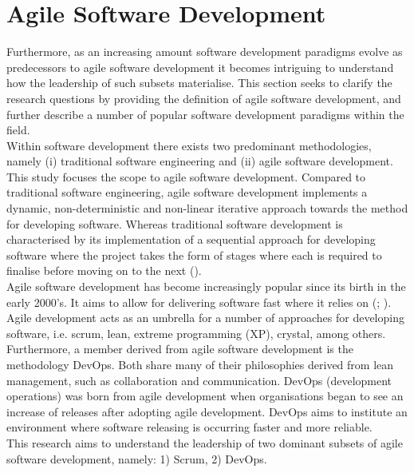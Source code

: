 \section{Agile Software Development}

Furthermore, as an increasing amount software development paradigms evolve as predecessors to agile software development it becomes intriguing to understand how the leadership of such subsets materialise. This section seeks to clarify the research questions by providing the definition of agile software development, and further describe a number of popular software development paradigms within the field.\\

Within software development there exists two predominant methodologies, namely (i) traditional software engineering and (ii) agile software development. This study focuses the scope to agile software development. Compared to traditional software engineering, agile software development implements a dynamic, non-deterministic and non-linear iterative approach towards the method for developing software. Whereas traditional software development is characterised by its implementation of a sequential approach for developing software where the project takes the form of stages where each is required to finalise before moving on to the next (\cite{larman2004agile}).\\

Agile software development has become increasingly popular since its birth in the early 2000's. It aims to allow for delivering software fast where it relies on \textit{} (\cite{nerur2005challenges}; \cite{dyba2000improvisation}). Agile development acts as an umbrella for a number of approaches for developing software, i.e. scrum, lean, extreme programming (XP), crystal, among others. Furthermore, a member derived from agile software development is the methodology DevOps. Both share many of their philosophies derived from lean management, such as collaboration and communication. DevOps (development operations) was born from agile development when organisations began to see an increase of releases after adopting agile development. DevOps aims to institute an environment where software releasing is occurring faster and more reliable.\\

This research aims to understand the leadership of two dominant subsets of agile software development, namely: 1) Scrum, 2) DevOps.\\







